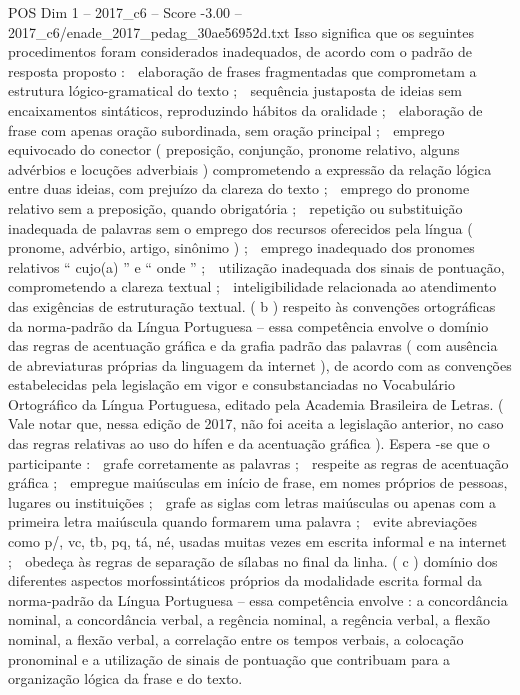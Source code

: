 \begin{textsample}{POS Dim 1 – 2017\_c6 – Score -3.00 – 2017\_c6/enade\_2017\_pedag\_30ae56952d.txt}
Isso significa que os seguintes procedimentos foram considerados inadequados, de acordo com o padrão de resposta proposto :  elaboração de frases fragmentadas que comprometam a estrutura lógico-gramatical do texto ;  sequência justaposta de ideias sem encaixamentos sintáticos, reproduzindo hábitos da oralidade ;  elaboração de frase com apenas oração subordinada, sem oração principal ;  emprego equivocado do conector ( preposição, conjunção, pronome relativo, alguns advérbios e locuções adverbiais ) comprometendo a expressão da relação lógica entre duas ideias, com prejuízo da clareza do texto ;  emprego do pronome relativo sem a preposição, quando obrigatória ;  repetição ou substituição inadequada de palavras sem o emprego dos recursos oferecidos pela língua ( pronome, advérbio, artigo, sinônimo ) ;  emprego inadequado dos pronomes relativos “ cujo(a) ” e “ onde ” ;  utilização inadequada dos sinais de pontuação, comprometendo a clareza textual ;  inteligibilidade relacionada ao atendimento das exigências de estruturação textual. ( b ) respeito às convenções ortográficas da norma-padrão da Língua Portuguesa – essa competência envolve o domínio das regras de acentuação gráfica e da grafia padrão das palavras ( com ausência de abreviaturas próprias da linguagem da internet ), de acordo com as convenções estabelecidas pela legislação em vigor e consubstanciadas no Vocabulário Ortográfico da Língua Portuguesa, editado pela Academia Brasileira de Letras. ( Vale notar que, nessa edição de 2017, não foi aceita a legislação anterior, no caso das regras relativas ao uso do hífen e da acentuação gráfica ).
Espera -se que o participante :  grafe corretamente as palavras ;  respeite as regras de acentuação gráfica ;  empregue maiúsculas em início de frase, em nomes próprios de pessoas, lugares ou instituições ;  grafe as siglas com letras maiúsculas ou apenas com a primeira letra maiúscula quando formarem uma palavra ;  evite abreviações como p/, vc, tb, pq, tá, né, usadas muitas vezes em escrita informal e na internet ;  obedeça às regras de separação de sílabas no final da linha. ( c ) domínio dos diferentes aspectos morfossintáticos próprios da modalidade escrita formal da norma-padrão da Língua Portuguesa – essa competência envolve : a concordância nominal, a concordância verbal, a regência nominal, a regência verbal, a flexão nominal, a flexão verbal, a correlação entre os tempos verbais, a colocação pronominal e a utilização de sinais de pontuação que contribuam para a organização lógica da frase e do texto.

\end{textsample}
